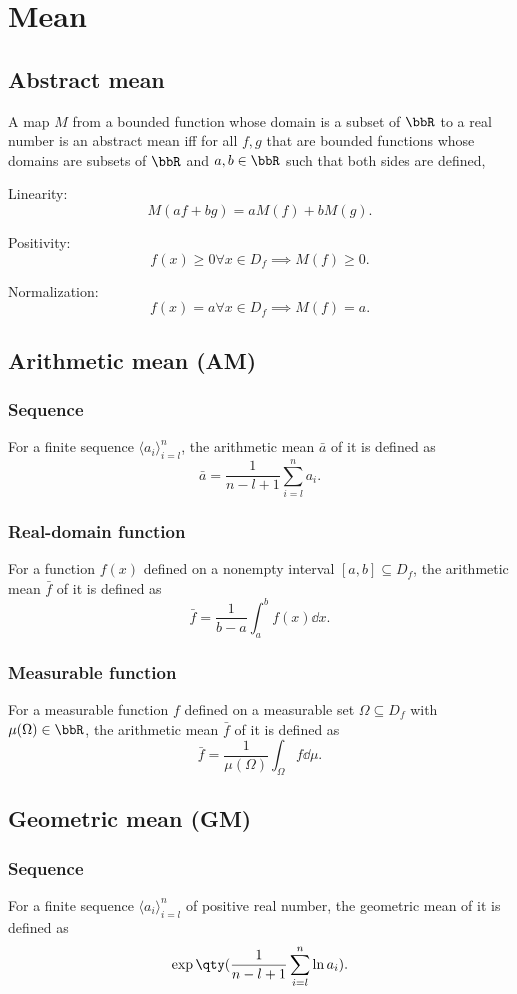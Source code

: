 \section{Mean}
\subsection{Abstract mean}
A map $M$ from a bounded function whose domain is a subset of $\bbR$ to a real number is an abstract mean iff for all $f,g$ that are bounded functions whose domains are subsets of $\bbR$ and $a,b\in\bbR$ such that both sides are defined,
\bit
\item Linearity:
\[M(af+bg)=aM(f)+bM(g).\]
\item Positivity:
\[f(x)\geq0\forall x\in D_f\implies M(f)\geq0.\]
\item Normalization:
\[f(x)=a\forall x\in D_f\implies M(f)=a.\]
\eit
\subsection{Arithmetic mean (AM)}
\subsubsection{Sequence}
For a finite sequence $\langle a_i\rangle_{i=l}^n$, the arithmetic mean $\bar{a}$ of it is defined as
\[\bar{a}=\frac{1}{n-l+1}\sum_{i=l}^na_i.\]
\subsubsection{Real-domain function}
For a function $f(x)$ defined on a nonempty interval $[a,b]\subseteq D_f$, the arithmetic mean $\bar{f}$ of it is defined as
\[\bar{f}=\frac{1}{b-a}\int_a^bf(x)\dd{x}.\]
\subsubsection{Measurable function}
For a measurable function $f$ defined on a measurable set $\Omega\subseteq D_f$ with $\mu(\Omega)\in\bbR$, the arithmetic mean $\bar{f}$ of it is defined as
\[\bar{f}=\frac{1}{\mu(\Omega)}\int_{\Omega}f\dd{\mu}.\]
\subsection{Geometric mean (GM)}
\subsubsection{Sequence}
For a finite sequence $\langle a_i\rangle_{i=l}^n$ of positive real number, the geometric mean of it is defined as
\[\exp\qty(\frac{1}{n-l+1}\sum_{i=l}^n\ln a_i).\]
